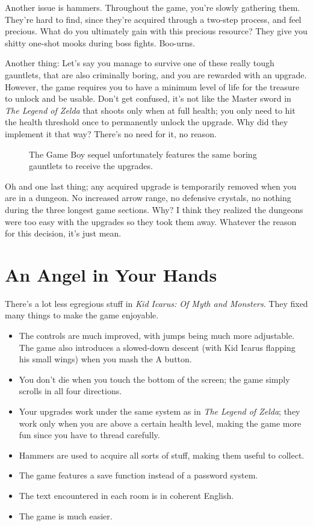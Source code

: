 \documentclass{book}
\begin{document}
Another issue is hammers. Throughout the game, you’re slowly gathering them. They’re hard to find, since they’re acquired through a two-step process, and feel precious. What do you ultimately gain with this precious resource? They give you shitty one-shot mooks during boss fights. Boo-urns.\par
Another thing: Let’s say you manage to survive one of these really tough gauntlets, that are also criminally boring, and you are rewarded with an upgrade. However, the game requires you to have a minimum level of life for the treasure to unlock and be usable. Don’t get confused, it’s not like the Master sword in \emph{The Legend of Zelda} that shoots only when at full health; you only need to hit the health threshold once to permanently unlock the upgrade. Why did they implement it that way? There’s no need for it, no reason.\par
\FloatBarrier\vspace{\baselineskip}\begin{figure}[H]\caption*{The Game Boy sequel unfortunately features the same boring gauntlets to receive the upgrades.}\end{figure}
Oh and one last thing; any acquired upgrade is temporarily removed when you are in a dungeon. No increased arrow range, no defensive crystals, no nothing during the three longest game sections. Why? I think they realized the dungeons were too easy with the upgrades so they took them away. Whatever the reason for this decision, it’s just mean.\par
\FloatBarrier\section*{An Angel in Your Hands}
There’s a lot less egregious stuff in \emph{Kid Icarus: Of Myth and Monsters}. They fixed many things to make the game enjoyable.\par
\begin{itemize}

\item The controls are much improved, with jumps being much more adjustable. The game also introduces a slowed-down descent (with Kid Icarus flapping his small wings) when you mash the A button.
\item You don’t die when you touch the bottom of the screen; the game simply scrolls in all four directions.
\item Your upgrades work under the same system as in \emph{The Legend of Zelda}; they work only when you are above a certain health level, making the game more fun since you have to thread carefully.
\item Hammers are used to acquire all sorts of stuff, making them useful to collect.
\item The game features a save function instead of a password system.
\item The text encountered in each room is in coherent English.
\item The game is much easier.

\end{itemize}
\end{document}
